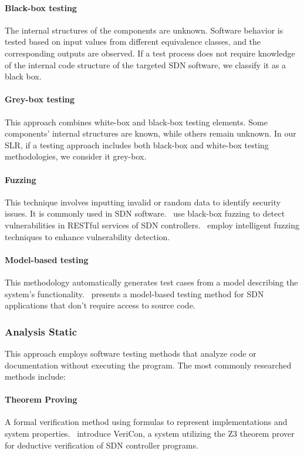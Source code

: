 \paragraph{Black-box testing} The internal structures of the components are unknown. Software behavior is tested based on input values from different equivalence classes, and the corresponding outputs are observed. If a test process does not require knowledge of the internal code structure of the targeted SDN software, we classify it as a black box.

\paragraph{Grey-box testing} This approach combines white-box and black-box testing elements. Some components' internal structures are known, while others remain unknown. In our SLR, if a testing approach includes both black-box and white-box testing methodologies, we consider it grey-box.

\paragraph{Fuzzing} This technique involves inputting invalid or random data to identify security issues. It is commonly used in SDN software.~\cite{8725649} use black-box fuzzing to detect vulnerabilities in RESTful services of SDN controllers.~\cite{10.1007/978-3-031-28451-9_46} employ intelligent fuzzing techniques to enhance vulnerability detection.

\paragraph{Model-based testing} This methodology automatically generates test cases from a model describing the system's functionality.~\cite{8107437} presents a model-based testing method for SDN applications that don't require access to source code.

\subsubsection{Analysis Static} This approach employs software testing methods that analyze code or documentation without executing the program. The most commonly researched methods include:
\paragraph{Theorem Proving} A formal verification method using formulas to represent implementations and system properties.~\cite{10.1145/2666356.2594317} introduce VeriCon, a system utilizing the Z3 theorem prover for deductive verification of SDN controller programs.

